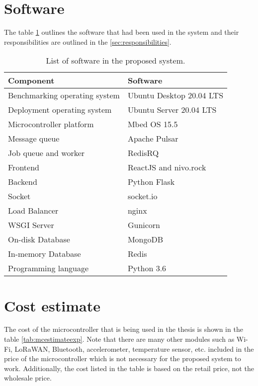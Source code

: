 \documentclass[../thesis.tex]{subfiles}
\begin{document}
\section{Software}
\label{sec:software}

The table \ref{tab:softwareList} outlines the software that had been used in the system and their responsibilities are outlined in the \autoref{sec:responsibilities}.

\begin{table}[h!]
\begin{center}
\caption{List of software in the proposed system.}
\label{tab:softwareList}
\begin{tabular}{l|l}
\toprule
\textbf{Component} & \textbf{Software}\\
\midrule
Benchmarking operating system & Ubuntu Desktop 20.04 LTS\\
Deployment operating system & Ubuntu Server 20.04 LTS\\
Microcontroller platform & Mbed OS 15.5\\
Message queue & Apache Pulsar\\
Job queue and worker & RedisRQ\\
Frontend & ReactJS and nivo.rock\\
Backend & Python Flask\\
Socket & socket.io\\
Load Balancer & nginx\\
WSGI Server & Gunicorn\\
On-disk Database & MongoDB\\
In-memory Database & Redis\\
Programming language & Python 3.6\\
\bottomrule
\end{tabular}
\end{center}
\end{table}

\section{Cost estimate}

The cost of the microcontroller that is being used in the thesis is shown in the table \ref{tab:mcestimateexp}. Note that there are many other modules such as Wi-Fi, LoRaWAN, Bluetooth, accelerometer, temperature sensor, etc. included in the price of the microcontroller which is not necessary for the proposed system to work. Additionally, the cost listed in the table is based on the retail price, not the wholesale price.
\end{document}
